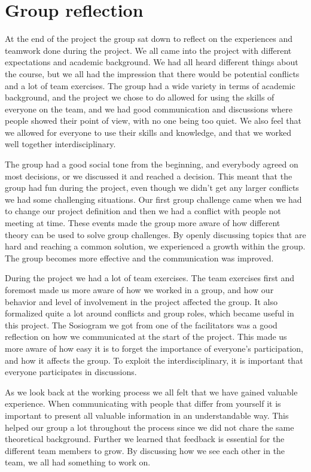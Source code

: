 \chapter{Group reflection}
\label{chap:reflection}
%
At the end of the project the group sat down to reflect on the experiences and teamwork done during the project. We all came into the project with different expectations and academic background. We had all heard different things about the course, but we all had the impression that there would be potential conflicts and a lot of team exercises. The group had a wide variety in terms of academic background, and the project we chose to do allowed for using the skills of everyone on the team, and we had good communication and discussions where people showed their point of view, with no one being too quiet. We also feel that we allowed for everyone to use their skills and knowledge, and that we worked well together interdisciplinary.

The group had a good social tone from the beginning, and everybody agreed on most decisions, or we discussed it and reached a decision. This meant that the group had fun during the project, even though we didn't get any larger conflicts we had some challenging situations. Our first group challenge came when we had to change our project definition and then we had a conflict with people not meeting at time. These events made the group more aware of how different theory can be used to solve group challenges. By openly discussing topics that are hard and reaching a common solution, we experienced a growth within the group. The group becomes more effective and the communication was improved.

During the project we had a lot of team exercises. The team exercises first and foremost made us more aware of how we worked in a group, and how our behavior and level of involvement in the project affected the group. It also formalized quite a lot around conflicts and group roles, which became useful in this project. The Sosiogram we got from one of the facilitators was a good reflection on how we communicated at the start of the project. This made us more aware of how easy it is to forget the importance of everyone’s participation, and how it affects the group. To exploit the interdisciplinary, it is important that everyone participates in discussions. 

As we look back at the working process we all felt that we have gained valuable experience. When communicating with people that differ from yourself it is important to present all valuable information in an understandable way. This helped our group a lot throughout the process since we did not chare the same theoretical background. Further we learned that feedback is essential for the different team members to grow. By discussing how we see each other in the team, we all had something to work on.
